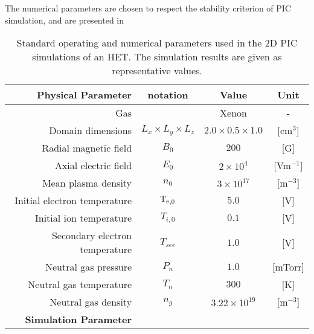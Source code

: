   The numerical parameters are chosen to respect the stability criterion of \ac{PIC} simulation, and are presented in 
  
  \begin{table}[htbp] %
       \centering
       \caption{\label{parameters} Standard operating and numerical parameters used in the 2D PIC simulations of an HET.  The simulation results are given as representative values.}
       \begin{tabular}{@{}r c c c@{}} 
          \toprule
          {\bf Physical Parameter} & notation & Value & Unit \\
          \midrule
          Gas & & Xenon & - \\
          Domain dimensions & $L_{x} \times L_{y} \times L_{z}$ & $2.0 \times 0.5 \times 1.0$ & [cm$^3$] \\
          Radial magnetic field & $B_{0}$                    & $200$                 & [{G}] \\
          Axial electric field & $E_{0}$                    & $2 \times 10^{4}$     & [{Vm}$^{-1}$] \\
          Mean plasma density & $n_{0}$                    & $3 \times 10^{17}$    & [{m}$^{-3}$] \\
          Initial electron temperature & $\mathrm{T_e}_{,0}  $               & $5.0$                 & [{V}] \\
          Initial ion temperature & $T_{i,0}   $               & $0.1$                 & [{V}] \\
          Secondary electron temperature & $T_{see}   $               & $1.0$                 & [{V}] \\
          Neutral gas pressure & $P_{n}     $               & $1.0$                 & [{mTorr}] \\
          Neutral gas temperature & $T_{n}     $               & $300$                 & [{K}] \\
          Neutral gas density & $n_{g}     $               & $3.22 \times 10^{19}$ & [{m}$^{-3}$]\\
          \midrule
          {\bf Simulation Parameter} &  &   &  \\
          

\end{tabular}
\end{table}
